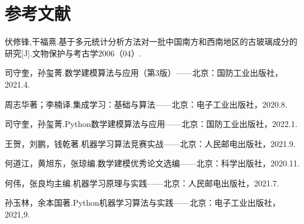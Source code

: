 \section{参考文献}


\renewcommand{\refname}{}
\vspace{-3em}  


\begin{thebibliography}{200}  
	伏修锋,干福熹.基于多元统计分析方法对一批中国南方和西南地区的古玻璃成分的研究[J].文物保护与考古学2006（04）.
	
	司守奎，孙玺菁.数学建模算法与应用（第3版）——北京：国防工业出版社，2021.4.
	
	周志华著；李楠译.集成学习：基础与算法——北京：电子工业出版社，2020.8. 
	
	司守奎，孙玺菁.Python数学建模算法与应用——北京：国防工业出版社，2022.1.
	
	王贺，刘鹏，钱乾著.机器学习算法竞赛实战——北京：人民邮电出版社，2021.9.
	
	何道江，黄旭东，张琼编.数学建模优秀论文选编——北京：科学出版社，2020.11.
	
	何伟，张良均主编.机器学习原理与实践——北京：人民邮电出版社，2021.7.
	
	孙玉林，余本国著.Python机器学习算法与实践——北京：电子工业出版社，2021,9.
\end{thebibliography} 